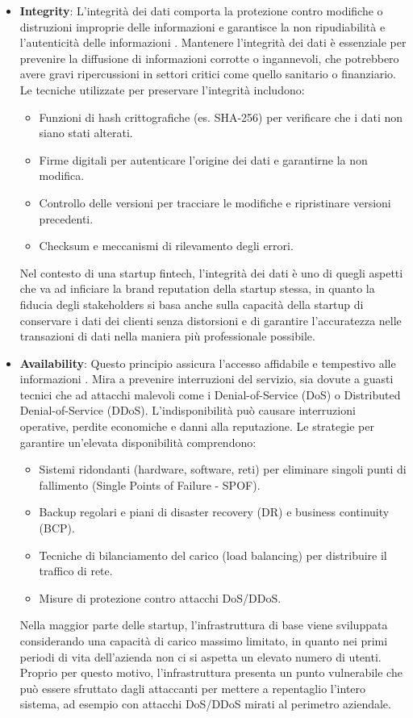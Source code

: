 \documentclass[a4paper,12pt]{report}
\begin{document}
\begin{itemize}
\item \textbf{Integrity}: L'integrità dei dati comporta la protezione contro modifiche o distruzioni improprie delle informazioni e garantisce la non ripudiabilità e l'autenticità delle informazioni \cite{NIST_SP_1800_26}. Mantenere l'integrità dei dati è essenziale per prevenire la diffusione di informazioni corrotte o ingannevoli, che potrebbero avere gravi ripercussioni in settori critici come quello sanitario o finanziario. Le tecniche utilizzate per preservare l'integrità includono:
\begin{itemize}
    \item Funzioni di hash crittografiche (es. SHA-256) per verificare che i dati non siano stati alterati.
    \item Firme digitali per autenticare l'origine dei dati e garantirne la non modifica.
    \item Controllo delle versioni per tracciare le modifiche e ripristinare versioni precedenti.
    \item Checksum e meccanismi di rilevamento degli errori.
\end{itemize}

Nel contesto di una startup fintech, l'integrità dei dati è uno di quegli aspetti che va ad inficiare la brand reputation della startup stessa, in quanto la fiducia degli stakeholders si basa anche sulla capacità della startup di conservare i dati dei clienti senza distorsioni e di garantire l'accuratezza nelle transazioni di dati nella maniera più professionale possibile.

\item \textbf{Availability}: Questo principio assicura l'accesso affidabile e tempestivo alle informazioni \cite{NIST_SP_1800_26}. Mira a prevenire interruzioni del servizio, sia dovute a guasti tecnici che ad attacchi malevoli come i Denial-of-Service (DoS) o Distributed Denial-of-Service (DDoS). L'indisponibilità può causare interruzioni operative, perdite economiche e danni alla reputazione. Le strategie per garantire un'elevata disponibilità comprendono:
\begin{itemize}
    \item Sistemi ridondanti (hardware, software, reti) per eliminare singoli punti di fallimento (Single Points of Failure - SPOF).
    \item Backup regolari e piani di disaster recovery (DR) e business continuity (BCP).
    \item Tecniche di bilanciamento del carico (load balancing) per distribuire il traffico di rete.
    \item Misure di protezione contro attacchi DoS/DDoS.
\end{itemize}

Nella maggior parte delle startup, l'infrastruttura di base viene sviluppata considerando una capacità di carico massimo limitato, in quanto nei primi periodi di vita dell'azienda non ci si aspetta un elevato numero di utenti. Proprio per questo motivo, l'infrastruttura presenta un punto vulnerabile che può essere sfruttato dagli attaccanti per mettere a repentaglio l'intero sistema, ad esempio con attacchi DoS/DDoS mirati al perimetro aziendale.
\end{itemize}
\end{document}
